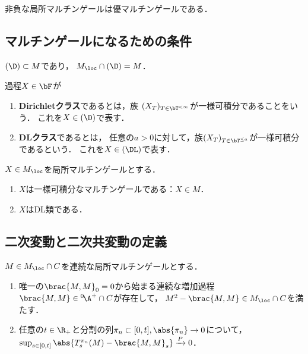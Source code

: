 \documentclass[uplatex,dvipdfmx]{jsreport}
\begin{document}
\begin{proposition}
    非負な局所マルチンゲールは優マルチンゲールである．
\end{proposition}

\subsection{マルチンゲールになるための条件}

\begin{tcolorbox}[colframe=ForestGreen, colback=ForestGreen!10!white,breakable,colbacktitle=ForestGreen!40!white,coltitle=black,fonttitle=\bfseries\sffamily,
title=]
    $(\D)\subset M$であり，
    $M_\loc\cap (\D)=M$．
\end{tcolorbox}

\begin{definition}
    過程$X\in\bF$が
    \begin{enumerate}
        \item \textbf{Dirichletクラス}であるとは，族
        $(X_T)_{T\in\bT^{<\infty}}$が一様可積分であることをいう．
        これを$X\in(\D)$で表す．
        \item \textbf{DLクラス}であるとは，
        任意の$a>0$に対して，族$(X_T)_{T\in\bT^{\le a}}$が一様可積分であるという．
        これを$X\in(\DL)$で表す．
    \end{enumerate}
\end{definition}

\begin{theorem}
    $X\in M_\loc$を局所マルチンゲールとする．
    \begin{enumerate}
        \item $X$は一様可積分なマルチンゲールである：$X\in M$．
        \item $X$はDL類である．
    \end{enumerate}
\end{theorem}

\subsection{二次変動と二次共変動の定義}

\begin{theorem}
    $M\in M_\loc\cap C$を連続な局所マルチンゲールとする．
    \begin{enumerate}
        \item 唯一の$\brac{M,M}_0=0$から始まる連続な増加過程$\brac{M,M}\in{}^0\!\A^+\cap C$が存在して，
        $M^2-\brac{M,M}\in M_\loc\cap C$を満たす．
        \item 任意の$t\in\R_+$と分割の列$\pi_n\subset[0,t],\abs{\pi_n}\to0$について，$\sup_{s\in[0,t]}\abs{T_s^{\pi_n}(M)-\brac{M,M}_s}\xrightarrow{P}0$．
    \end{enumerate}
\end{theorem}
\end{document}

